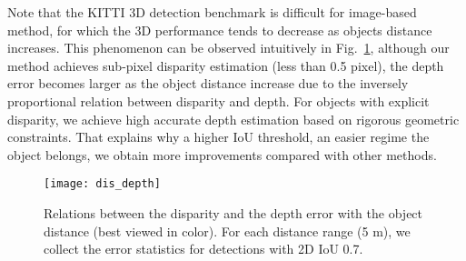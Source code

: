 \documentclass[10pt,twocolumn,letterpaper]{article}
\begin{document}
	Note that the KITTI 3D detection benchmark is difficult for image-based method, for which the 3D performance tends to decrease as objects distance increases. This phenomenon can be observed  intuitively in Fig.~\ref{fig:depth_dis}, although our method achieves sub-pixel disparity estimation (less than 0.5 pixel), the depth error becomes larger as the object distance increase due to the inversely proportional relation between disparity and depth. For objects with explicit disparity, we achieve high accurate depth estimation based on rigorous geometric constraints. That explains why a higher IoU threshold, an easier regime the object belongs, we obtain more improvements compared with other methods.
	\begin{figure}
		\begin{center}
			\texttt{[image: dis\_depth]}
		\end{center}
		\caption{Relations between the disparity and the depth error with the object distance (best viewed in color). For each distance range (5 m), we collect the error statistics for detections with 2D IoU  0.7.}
		\label{fig:depth_dis}
	\end{figure}
	\begin{table}
	\setlength{\belowcaptionskip}{-0.3cm}
		\begin{center}
			\renewcommand{\arraystretch}{1.3}
		\end{center}
		\caption{3D detection and localization AP on the KITTI \textit{test set}.}
		\label{tab:test}
		\vspace{-0.3cm}
	\end{table}	
\iffalse	
\end{document}
